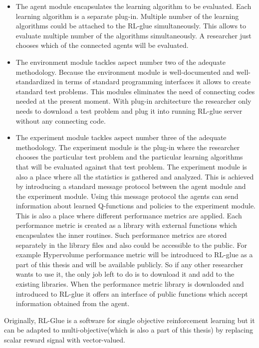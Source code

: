 \begin{itemize}

\item The agent module encapsulates the learning algorithm to be evaluated. Each learning algorithm is a separate plug-in. Multiple number of the learning algorithms could be attached to the RL-glue simultaneously. This allows to evaluate multiple number of the algorithms simultaneously. A researcher just chooses which of the connected agents will be evaluated.

\item The environment module tackles aspect number two of the adequate methodology. Because the environment module is well-documented and well-standardized in terms of standard programming interfaces it allows to create standard test problems. This modules eliminates the need of connecting codes needed at the present moment. With plug-in architecture the researcher only needs to download a test problem and plug it into running RL-glue server without any connecting code.

\item The experiment module tackles aspect number three of the adequate methodology. The experiment module is the plug-in where the researcher chooses the particular test problem and the particular learning algorithms that will be evaluated against that test problem. The experiment module is also a place where all the statistics is gathered and analyzed. This is achieved by introducing a standard message protocol between the agent module and the experiment module. Using this message protocol the agents can send information about learned Q-functions and policies to the experiment module. This is also a place where different performance metrics are applied. Each performance metric is created as a library with external functions which encapsulates the inner routines. Such performance metrics are stored separately in the library files and also could be accessible to the public. For example Hypervolume performance metric will be introduced to RL-glue as a part of this thesis and will be available publicly. So if any other researcher wants to use it, the only job left to do is to download it and add to the existing libraries. When the performance metric library is downloaded and introduced to RL-glue it offers an interface of public functions which accept information obtained from the agent.

\end{itemize}

Originally, RL-Glue is a software for single objective reinforcement learning but it can be adapted to multi-objective(which is also a part of this thesis) by replacing scalar reward signal with vector-valued. \\

